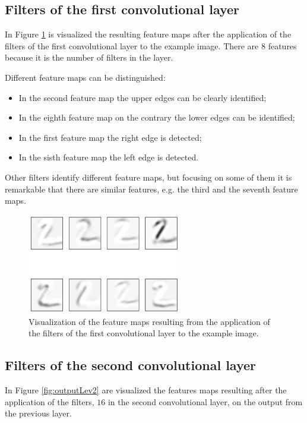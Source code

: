 \subsection{Filters of the first convolutional layer}

In Figure \ref{fig:outputLev1} is visualized the resulting feature maps after the application of the filters of the first convolutional layer to the example image. There are $8$ features because it is the number of filters in the layer.

Different feature maps can be distinguished:
\begin{itemize}
	\item In the second feature map the upper edges can be clearly identified;
	\item In the eighth feature map on the contrary the lower edges can be identified;
	\item In the first feature map the right edge is detected;
	\item In the sisth feature map the left edge is detected.
\end{itemize}

Other filters identify different feature maps, but focusing on some of them it is remarkable that there are similar features, e.g. the third and the seventh feature maps.

\begin{figure}
	\centering
	\includegraphics[width=0.6\textwidth]{Images/conv_outputLev1_digit2}
	\caption{Visualization of the feature maps resulting from the application of the filters of the first convolutional layer to the example image.}
	\label{fig:outputLev1}
\end{figure}

\subsection{Filters of the second convolutional layer}

In Figure \ref{fig:outputLev2} are visualized the features maps resulting after the application of the filters, $16$ in the second convolutional layer, on the output from the previous layer.

